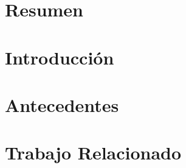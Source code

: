\documentclass[12pt,spanish]{book}
\begin{document}


\newpage{}
\cleardoublepage

\tableofcontents
\renewcommand{\listfigurename}{Índice de Figuras}
\renewcommand{\listtablename}{Índice de Tablas}
\listoffigures
\listoftables

\newpage
\chapter*{Resumen}
%

\newpage
\cleardoublepage




\chapter{Introducción}


\chapter{Antecedentes}

\label{ch:antecedentes}

\chapter{Trabajo Relacionado}

\end{document}
